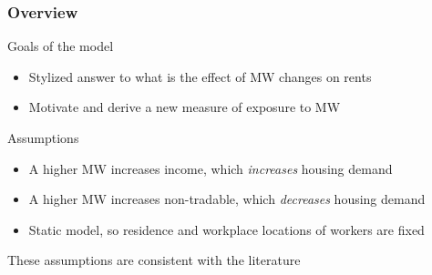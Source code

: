 \documentclass[aspectratio=169, t]{beamer}
\begin{document}
\begin{frame}
    \frametitle{Overview}
    
    Goals of the model
    \begin{itemize}
        \item Stylized answer to what is the effect of MW changes on rents
        \item Motivate and derive a new measure of exposure to MW
    \end{itemize}
    
    \pause
    \vspace{3mm}
    Assumptions
    \begin{itemize}
        \item A higher MW increases income, which \textit{increases} housing demand
        \item A higher MW increases non-tradable, which \textit{decreases} housing demand
        \item Static model, so residence and workplace locations of workers are fixed
    \end{itemize}
    These assumptions are consistent with the literature

\end{frame}
\end{document}
